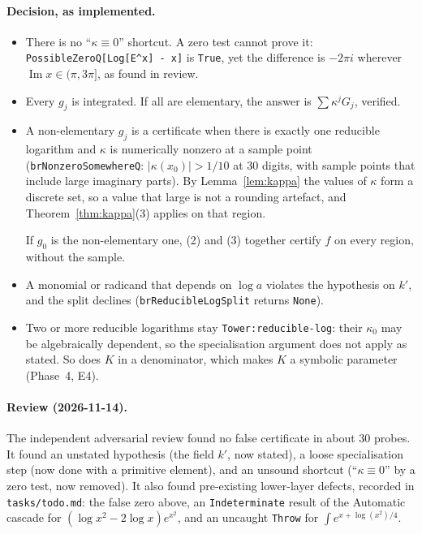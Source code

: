 \documentclass[11pt]{article}
\theoremstyle{definition}
\theoremstyle{remark}
\newcommand{\code}[1]{\texttt{#1}}
\begin{document}
\paragraph{Decision, as implemented.}
\begin{itemize}
\item There is no ``$\kappa\equiv0$'' shortcut. A zero test cannot prove it:
  \code{PossibleZeroQ[Log[E\^{}x] - x]} is \code{True}, yet the difference is
  $-2\pi i$ wherever $\operatorname{Im}x\in(\pi,3\pi]$, as found in review.
\item Every $g_j$ is integrated. If all are elementary, the answer is
  $\sum\kappa^jG_j$, verified.
\item A non-elementary $g_j$ is a certificate when there is exactly one
  reducible logarithm and $\kappa$ is numerically nonzero at a sample point
  (\code{brNonzeroSomewhereQ}: $|\kappa(x_0)|>1/10$ at 30 digits, with sample
  points that include large imaginary parts). By
  Lemma~\ref{lem:kappa} the values of $\kappa$ form a discrete set, so a value
  that large is not a rounding artefact, and Theorem~\ref{thm:kappa}(3) applies
  on that region.

  If $g_0$ is the non-elementary one, (2) and (3) together certify $f$ on every
  region, without the sample.
\item A monomial or radicand that depends on $\log a$ violates the hypothesis on
  $k'$, and the split declines (\code{brReducibleLogSplit} returns
  \code{None}).
\item Two or more reducible logarithms stay \code{Tower:reducible-log}: their
  $\kappa_0$ may be algebraically dependent, so the specialisation argument does
  not apply as stated. So does $K$ in a denominator, which makes $K$ a symbolic
  parameter (Phase~4, E4).
\end{itemize}

\paragraph{Review (2026-11-14).} The independent adversarial review found no
false certificate in about 30 probes. It found an unstated hypothesis (the field
$k'$, now stated), a loose specialisation step (now done with a primitive
element), and an unsound shortcut (``$\kappa\equiv0$'' by a zero test, now
removed). It also found pre-existing lower-layer defects, recorded in
\code{tasks/todo.md}: the false zero above, an \code{Indeterminate} result of the
Automatic cascade for $(\log x^2-2\log x)e^{x^2}$, and an uncaught \code{Throw}
for $\int e^{x+\log(x^2)/4}$.
\end{document}
